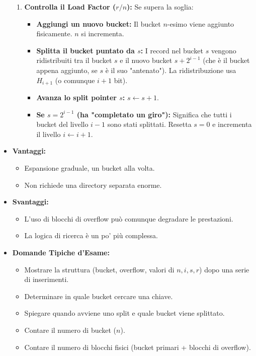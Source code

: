 \begin{itemize}
\begin{enumerate}
        \item \textbf{Controlla il Load Factor ($r/n$):} Se supera la soglia:
        \begin{itemize}
            \item \textbf{Aggiungi un nuovo bucket:} Il bucket $n$-esimo viene aggiunto fisicamente. $n$ si incrementa.
            \item \textbf{Splitta il bucket puntato da $s$:} I record nel bucket $s$ vengono ridistribuiti tra il bucket $s$ e il nuovo bucket $s + 2^{i-1}$ (che è il bucket appena aggiunto, se $s$ è il suo "antenato"). La ridistribuzione usa $H_{i+1}$ (o comunque $i+1$ bit).
            \item \textbf{Avanza lo split pointer $s$:} $s \leftarrow s+1$.
            \item \textbf{Se $s = 2^{i-1}$ (ha "completato un giro"):} Significa che tutti i bucket del livello $i-1$ sono stati splittati. Resetta $s=0$ e incrementa il livello $i \leftarrow i+1$.
        \end{itemize}
    \end{enumerate}
    \item \textbf{Vantaggi:}
    \begin{itemize}
        \item Espansione graduale, un bucket alla volta.
        \item Non richiede una directory separata enorme.
    \end{itemize}
    \item \textbf{Svantaggi:}
    \begin{itemize}
        \item L'uso di blocchi di overflow può comunque degradare le prestazioni.
        \item La logica di ricerca è un po' più complessa.
    \end{itemize}
    \item \textbf{Domande Tipiche d'Esame:}
    \begin{itemize}
        \item Mostrare la struttura (bucket, overflow, valori di $n, i, s, r$) dopo una serie di inserimenti.
        \item Determinare in quale bucket cercare una chiave.
        \item Spiegare quando avviene uno split e quale bucket viene splittato.
        \item Contare il numero di bucket ($n$).
        \item Contare il numero di blocchi fisici (bucket primari + blocchi di overflow).
    \end{itemize}
\end{itemize}


